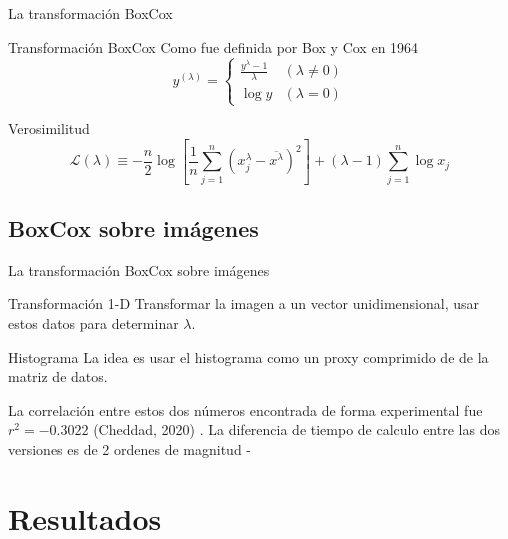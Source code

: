 \documentclass{beamer}
\begin{document}
\begin{frame}{La transformación BoxCox}
    \pause
    \begin{block}{Transformación BoxCox}
    Como fue definida por Box y Cox en 1964 \cite{boxcox}
        \begin{equation}\label{boxcox}
            y^{(\lambda)}= \begin{cases}\frac{y^{\lambda}-1}{\lambda} & (\lambda \neq 0) \\ \log y & (\lambda=0)\end{cases}
        \end{equation}
    \end{block}
        \pause
    \begin{block}{Verosimilitud}
        \begin{equation*}
            \mathcal{L}(\lambda) \equiv-\frac{n}{2} \log \left[\frac{1}{n} \sum_{j=1}^{n}\left(x_{j}^{\lambda}-\overline{x^{\lambda}}\right)^{2}\right] +(\lambda-1) \sum_{j=1}^{n} \log x_{j}
        \end{equation*}
    \end{block}
    
\end{frame}

\subsection{BoxCox sobre imágenes}

\begin{frame}{La transformación BoxCox sobre imágenes}
    \pause
    \begin{block}{Transformación 1-D}
        Transformar la imagen a un vector unidimensional, usar estos datos para determinar $\lambda$.
    \end{block}
    
        \pause
        
    \begin{block}{Histograma}
        La idea es usar el histograma como un proxy comprimido de de la matriz de datos. 
    \end{block}
        \pause
    
    La correlación entre estos dos números encontrada de forma experimental fue $r^2=-0.3022$ (Cheddad, 2020) \cite{cheddad2020}. La diferencia de tiempo de calculo entre las dos versiones es de 2 ordenes de magnitud
    -
\end{frame}


\section{Resultados}
\end{document}
